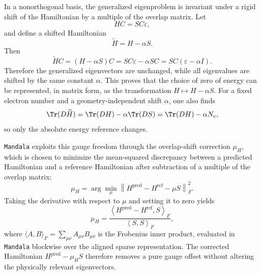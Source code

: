 In a nonorthogonal basis, the generalized eigenproblem is invariant under a
rigid shift of the Hamiltonian by a multiple of the overlap matrix. Let
\begin{equation}
H C = S C \varepsilon,
\end{equation}
and define a shifted Hamiltonian
\begin{equation}
\widetilde{H} = H - \alpha S.
\end{equation}
Then
\begin{equation}
\widetilde{H} C
=
(H-\alpha S) C
=
S C \varepsilon - \alpha S C
=
S C (\varepsilon - \alpha I).
\end{equation}
Therefore the generalized eigenvectors are unchanged, while all eigenvalues are
shifted by the same constant $\alpha$. This proves that the choice of zero of
energy can be represented, in matrix form, as the transformation
$H \mapsto H - \alpha S$. For a fixed electron number and a geometry-independent
shift $\alpha$, one also finds
\begin{equation}
\Tr(D\widetilde{H}) = \Tr(DH) - \alpha \Tr(DS) = \Tr(DH) - \alpha N_e,
\end{equation}
so only the absolute energy reference changes.

\texttt{Mandala} exploits this gauge freedom through the overlap-shift correction
$\mu_H$, which is chosen to minimize the mean-squared discrepancy between a
predicted Hamiltonian and a reference Hamiltonian after subtraction of a
multiple of the overlap matrix:
\begin{equation}
\mu_H
=
\arg\min_{\mu}
\left\|
H^{\mathrm{pred}} - H^{\mathrm{ref}} - \mu S
\right\|_F^2.
\end{equation}
Taking the derivative with respect to $\mu$ and setting it to zero yields
\begin{equation}
\mu_H
=
\frac{
\left\langle
H^{\mathrm{pred}} - H^{\mathrm{ref}}, S
\right\rangle_F
}{
\left\langle S, S \right\rangle_F
},
\end{equation}
where $\langle A,B\rangle_F = \sum_{\mu \nu} A_{\mu \nu} B_{\mu \nu}$ is the
Frobenius inner product, evaluated in \texttt{Mandala} blockwise over the aligned sparse
representation. The corrected Hamiltonian
$H^{\mathrm{pred}} - \mu_H S$ therefore removes a pure gauge offset without
altering the physically relevant eigenvectors.
